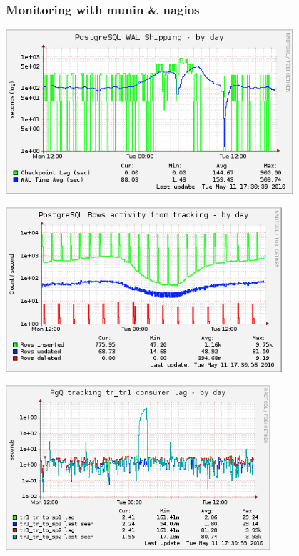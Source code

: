 \documentclass[english]{beamer}
\begin{document}
\begin{frame}[fragile]
  \frametitle{Monitoring with munin \& nagios}
  \begin{overprint}
  \begin{center} 
    \includegraphics[height=2.4in]{bdd-pg_walmgr-day.png}
  \end{center} 

  \begin{center} 
    \includegraphics[height=2.4in]{tr1-pg_user_tables_activity_tracking-day.png}
  \end{center} 

  \begin{center} 
    \includegraphics[height=2.4in]{tr1-pg_queue_tracking_tr_tr1-day.png}
  \end{center} 


\end{overprint}
\end{frame}
\end{document}
